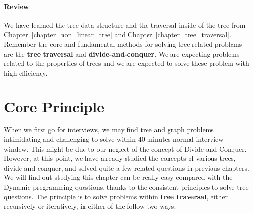 \documentclass[../main.tex]{subfiles}
\begin{document}
\paragraph{Review} We have learned the tree data structure and the traversal inside of the tree from Chapter~\ref{chapter_non_linear_tree} and Chapter~\ref{chapter_tree_traversal}. Remember the core and fundamental methods for solving tree related problems are the \textbf{tree traversal} and \textbf{divide-and-conquer}. We are expecting problems related to the properties of trees and we are expected to solve these problem with high efficiency. 


\section{Core Principle}
When we first go for interviews, we may find tree and graph problems intimidating and challenging to solve within 40 minutes normal interview window. This might be due to our neglect of the concept of Divide and Conquer. However, at this point, we have already studied the concepts of various trees, divide and conquer, and solved quite a few related questions in previous chapters. We will find out studying this chapter can be really easy compared with the Dynamic programming questions, thanks to the consistent principles to solve tree questions.  The principle is to solve problems within \textbf{tree traversal}, either recursively or iteratively,  in either of the follow two ways:  
\end{document}
